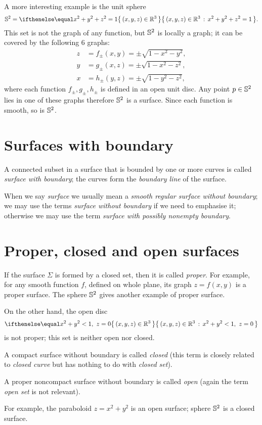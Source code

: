 A more interesting example is the unit sphere 
\[\SS^2=\set{(x,y,z)\in\RR^3}{x^2+y^2+z^2=1}.\]
This set is not the graph of any function,
but $\mathbb{S}^2$ is locally a graph;
it can be covered by the following 6 graphs:
\begin{align*}
z&=f_\pm(x,y)=\pm \sqrt{1-x^2-y^2},
\\
y&=g_\pm(x,z)=\pm \sqrt{1-x^2-z^2},
\\
x&=h_\pm(y,z)=\pm \sqrt{1-y^2-z^2},
\end{align*}
where each function $f_\pm,g_\pm,h_\pm$ is defined in an open unit disc.
Any point $p\in\mathbb{S}^2$ lies in one of these graphs therefore $\mathbb{S}^2$ is a surface.
Since each function is smooth, so is $\mathbb{S}^2$.

\section{Surfaces with boundary}
A connected subset in a surface that is bounded by one or more 
curves is called \emph{surface with boundary}; the curves form the \emph{boundary line} of the surface.

When we say \emph{surface} we usually mean a \emph{smooth regular surface without boundary};
we may use the terms \emph{surface without boundary} if we need to emphasise it;
otherwise we may use the term \emph{surface with possibly nonempty boundary}.

\section{Proper, closed and open surfaces}
If the surface $\Sigma$ is formed by a closed set, then it is called \emph{proper}.
For example, for any smooth function $f$, defined on whole plane, its graph $z=f(x,y)$ is a proper surface.
The sphere $\mathbb{S}^2$ gives another example of proper surface.

On the other hand, the open disc 
\[\set{(x,y,z)\in\RR^3}{x^2+y^2<1,\  z=0}\]
is not proper; this set is neither open nor closed.

A compact surface without boundary is called \emph{closed}
(this term is closely related to \emph{closed curve} but has nothing to do with \emph{closed set}).

A proper noncompact surface without boundary is called \emph{open} (again the term \emph{open set} is not relevant).

For example, the paraboloid $z=x^2+y^2$
is an open surface; 
sphere $\mathbb{S}^2$ is a closed surface.

